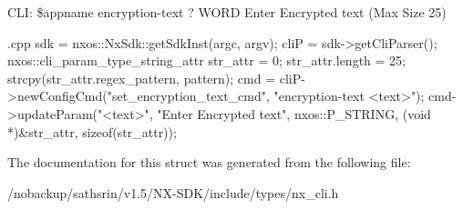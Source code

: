 CLI: \$appname encryption-\/text ? WORD Enter Encrypted text (Max Size 25)


\begin{DoxyCode}
 {.cpp}
       sdk = nxos::NxSdk::getSdkInst(argc, argv);
       cliP = sdk->getCliParser();
       nxos::cli_param_type_string_attr str_attr = {0};
       str_attr.length = 25;
       strcpy(str_attr.regex_pattern, pattern);
       cmd = cliP->newConfigCmd("set_encryption_text_cmd",
                                "encryption-text <text>");
       cmd->updateParam("<text>", "Enter Encrypted text", nxos::P_STRING,
                        (void *)&str_attr, sizeof(str_attr));
\end{DoxyCode}



 

The documentation for this struct was generated from the following file:\begin{DoxyCompactItemize}
\item 
/nobackup/sathsrin/v1.5/NX-\/SDK/include/types/nx\_\-cli.h\end{DoxyCompactItemize}
